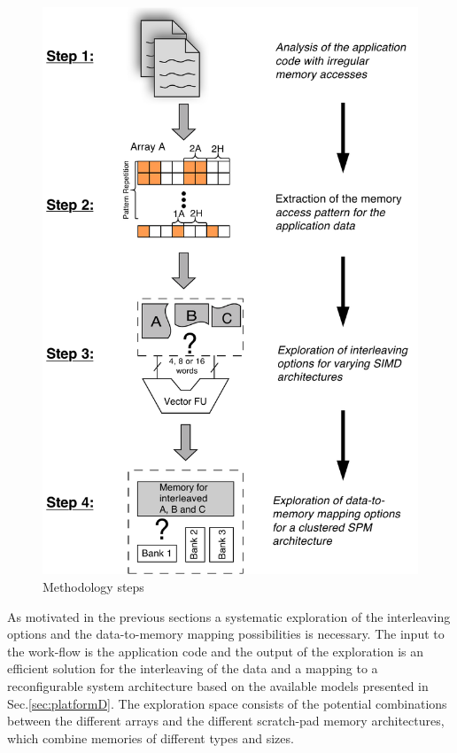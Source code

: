 \begin{figure}
\centering
	\includegraphics[scale = 0.6]{D/Images/workflow2.pdf} 
	\caption{Methodology steps}
	\label{fig:workflow}
\end{figure}

As motivated in the previous sections a systematic exploration of the interleaving options and the data-to-memory mapping possibilities is necessary.
The input to the work-flow is the application code and the output of the exploration is an efficient solution for the interleaving of the data and a mapping to a reconfigurable system architecture based on the available models presented in Sec.\ref{sec:platformD}.
The exploration space consists of the potential combinations between the different arrays and the different scratch-pad memory architectures, which combine memories of different types and sizes.

